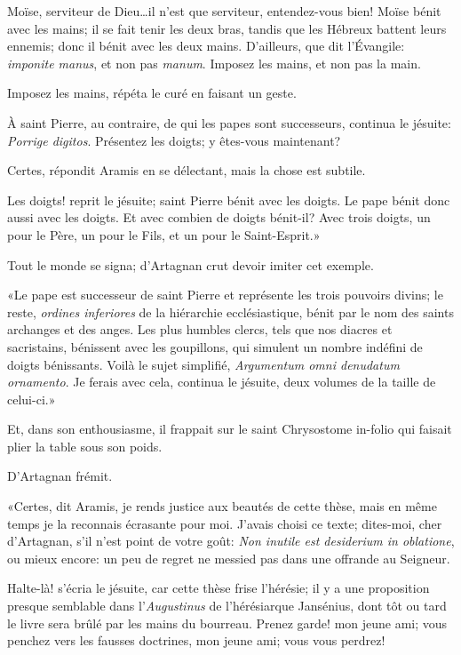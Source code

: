 \speak  Moïse, serviteur de Dieu\dots il n'est que serviteur, entendez-vous bien! Moïse bénit avec les mains; il se fait tenir les deux bras, tandis que les Hébreux battent leurs ennemis; donc il bénit avec les deux mains. D'ailleurs, que dit l'Évangile: \textit{imponite manus}, et non pas \textit{manum}. Imposez les mains, et non pas la main. 

\speak  Imposez les mains, répéta le curé en faisant un geste. 

\speak  À saint Pierre, au contraire, de qui les papes sont successeurs, continua le jésuite: \textit{Porrige digitos}. Présentez les doigts; y êtes-vous maintenant? 

\speak  Certes, répondit Aramis en se délectant, mais la chose est subtile. 

\speak  Les doigts! reprit le jésuite; saint Pierre bénit avec les doigts. Le pape bénit donc aussi avec les doigts. Et avec combien de doigts bénit-il? Avec trois doigts, un pour le Père, un pour le Fils, et un pour le Saint-Esprit.» 

Tout le monde se signa; d'Artagnan crut devoir imiter cet exemple. 

«Le pape est successeur de saint Pierre et représente les trois pouvoirs divins; le reste, \textit{ordines inferiores} de la hiérarchie ecclésiastique, bénit par le nom des saints archanges et des anges. Les plus humbles clercs, tels que nos diacres et sacristains, bénissent avec les goupillons, qui simulent un nombre indéfini de doigts bénissants. Voilà le sujet simplifié, \textit{Argumentum omni denudatum ornamento}. Je ferais avec cela, continua le jésuite, deux volumes de la taille de celui-ci.» 

Et, dans son enthousiasme, il frappait sur le saint Chrysostome in-folio qui faisait plier la table sous son poids. 

D'Artagnan frémit. 

«Certes, dit Aramis, je rends justice aux beautés de cette thèse, mais en même temps je la reconnais écrasante pour moi. J'avais choisi ce texte; dites-moi, cher d'Artagnan, s'il n'est point de votre goût: \textit{Non inutile est desiderium in oblatione}, ou mieux encore: un peu de regret ne messied pas dans une offrande au Seigneur. 

\speak  Halte-là! s'écria le jésuite, car cette thèse frise l'hérésie; il y a une proposition presque semblable dans l'\textit{Augustinus} de l'hérésiarque Jansénius, dont tôt ou tard le livre sera brûlé par les mains du bourreau. Prenez garde! mon jeune ami; vous penchez vers les fausses doctrines, mon jeune ami; vous vous perdrez! 

